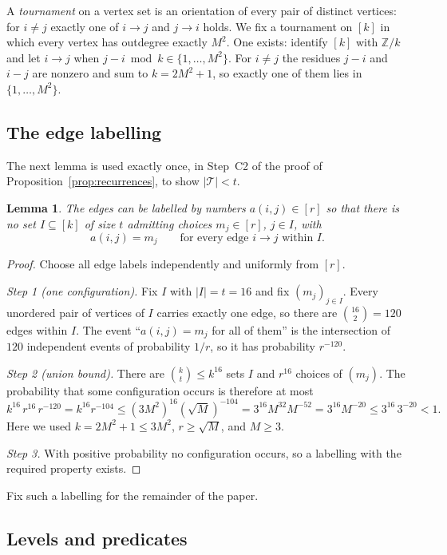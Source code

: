 \documentclass[11pt]{article}
\newtheorem{lemma}[theorem]{Lemma}
\theoremstyle{definition}
\theoremstyle{remark}
\begin{document}
A \emph{tournament} on a vertex set is an orientation of every pair of
distinct vertices: for \(i\ne j\) exactly one of \(i\to j\) and \(j\to i\)
holds. We fix a tournament on \([k]\) in which every vertex has outdegree
exactly \(M^2\). One exists: identify \([k]\) with \(\mathbb Z/k\) and let
\(i\to j\) when \(j-i \bmod k\in\{1,\ldots,M^2\}\). For \(i\ne j\) the residues
\(j-i\) and \(i-j\) are nonzero and sum to \(k=2M^2+1\), so exactly one of them
lies in \(\{1,\ldots,M^2\}\).

\subsection{The edge labelling}

The next lemma is used exactly once, in Step~C2 of the proof of
Proposition~\ref{prop:recurrences}, to show \(|\mathcal T|<t\).

\begin{lemma}\label{lem:labelling}
The edges can be labelled by numbers \(a(i,j)\in[r]\) so that there is
no set \(I\subseteq[k]\) of size \(t\) admitting choices
\(m_j\in[r]\), \(j\in I\), with
\[
 a(i,j)=m_j \qquad\text{for every edge }i\to j\text{ within }I.
\]
\end{lemma}
\begin{proof}
Choose all edge labels independently and uniformly from \([r]\).

\emph{Step 1 (one configuration).} Fix \(I\) with \(|I|=t=16\) and fix
\((m_j)_{j\in I}\). Every unordered pair of vertices of \(I\) carries exactly
one edge, so there are \(\binom{16}{2}=120\) edges within \(I\). The event
``\(a(i,j)=m_j\) for all of them'' is the intersection of \(120\) independent
events of probability \(1/r\), so it has probability \(r^{-120}\).

\emph{Step 2 (union bound).} There are \(\binom kt\le k^{16}\) sets \(I\) and
\(r^{16}\) choices of \((m_j)\). The probability that some configuration
occurs is therefore at most
\[
 k^{16}\,r^{16}\,r^{-120}=k^{16}r^{-104}
 \le (3M^2)^{16}(\sqrt M)^{-104}
 =3^{16}M^{32}M^{-52}=3^{16}M^{-20}\le 3^{16}\,3^{-20}<1 .
\]
Here we used \(k=2M^2+1\le3M^2\), \(r\ge\sqrt M\), and \(M\ge3\).

\emph{Step 3.} With positive probability no configuration occurs, so a
labelling with the required property exists.
\end{proof}

Fix such a labelling for the remainder of the paper.

\subsection{Levels and predicates}
\end{document}
